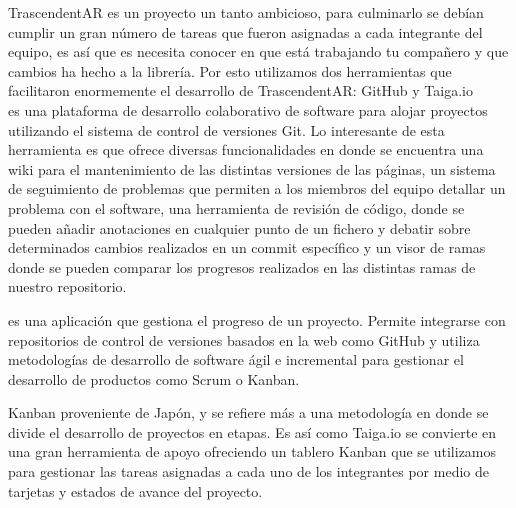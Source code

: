 \begin{multicols}{2}


TrascendentAR es un proyecto un tanto ambicioso, para culminarlo se debían cumplir un gran número de tareas que fueron asignadas a cada integrante del equipo, es así que es necesita conocer en que está trabajando tu compañero y que cambios ha hecho a la librería. Por esto utilizamos dos herramientas que facilitaron enormemente el desarrollo de TrascendentAR: GitHub y Taiga.io\\

 es una plataforma de desarrollo colaborativo de software para alojar proyectos utilizando el sistema de control de versiones Git. Lo interesante de esta herramienta es que ofrece diversas funcionalidades en donde se encuentra una wiki para el mantenimiento de las distintas versiones de las páginas, un sistema de seguimiento de problemas que permiten a los miembros del equipo detallar un problema con el software, una herramienta de revisión de código, donde se pueden añadir anotaciones en cualquier punto de un fichero y debatir sobre determinados cambios realizados en un commit específico y un visor de ramas donde se pueden comparar los progresos realizados en las distintas ramas de nuestro repositorio. \cite{github}





 es una aplicación que gestiona el progreso de un proyecto. Permite integrarse con repositorios de control de versiones basados en la web como GitHub y utiliza metodologías de desarrollo de software ágil e incremental para gestionar el desarrollo de productos como Scrum o Kanban. 

Kanban proveniente de Japón, y se refiere más a una metodología en donde se divide el desarrollo de proyectos en etapas. Es así como Taiga.io se convierte en una gran herramienta de apoyo ofreciendo un tablero Kanban que se utilizamos para gestionar las tareas asignadas a cada uno de los integrantes por medio de tarjetas y estados de avance del proyecto. 


\end{multicols}

